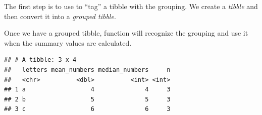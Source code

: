 \documentclass[krantz2]{krantz}\usepackage{knitr}%
\begin{document}
The first step is to use  to ``tag'' a tibble with the grouping. We create a \emph{tibble} and then convert it into a \emph{grouped tibble}.

\begin{knitrout}\footnotesize
{}\color{fgcolor}\begin{kframe}
\begin{alltt}
 \hlkwb{<-} \hlstd{(} \hlstd{=} \hlopt{:}\hlstd{,}  \hlstd{=} \hlstd{(letters[}\hlopt{:}\hlstd{],} \hlstd{))}
 \hlkwb{<-} 
\end{alltt}
\end{kframe}
\end{knitrout}

Once we have a grouped tibble, function  will recognize the grouping and use it when the summary values are calculated.

\begin{knitrout}\footnotesize
{}\color{fgcolor}\begin{kframe}
\begin{alltt}
           \hlstd{=} 
           \hlstd{=} 
           \hlstd{=} \hlstd{())}
\end{alltt}
\begin{verbatim}
## # A tibble: 3 x 4
##   letters mean_numbers median_numbers     n
##   <chr>          <dbl>          <int> <int>
## 1 a                  4              4     3
## 2 b                  5              5     3
## 3 c                  6              6     3
\end{verbatim}
\end{kframe}
\end{knitrout}
\end{document}
